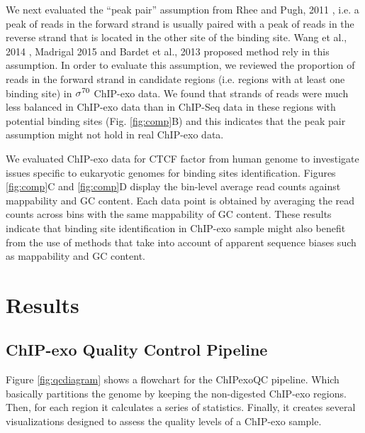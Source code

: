 \documentclass[11pt]{article}\usepackage[]{graphicx}\usepackage[]{color}
\begin{document}
We next evaluated the ``peak pair'' assumption from Rhee and Pugh,
2011 \cite{exo1}, i.e. a peak of reads in the forward strand is
usually paired with a peak of reads in the reverse strand that is
located in the other site of the binding site. Wang et al., 2014
\cite{mace}, Madrigal 2015 \cite{cexor} and Bardet et al., 2013
\cite{peakzilla} proposed method rely in this assumption. In order to
evaluate this assumption, we reviewed the proportion of reads in the
forward strand in candidate regions (i.e. regions with at least one
binding site) in $\sigma^{70}$ ChIP-exo data. We found that strands of reads
were much less balanced in ChIP-exo data than in ChIP-Seq data in
these regions with potential binding sites (Fig. \ref{fig:comp}B) and
this indicates that the peak pair assumption might not hold in real
ChIP-exo data.

We evaluated ChIP-exo data for CTCF factor from human genome
\cite{exo1} to investigate issues specific to eukaryotic genomes for
binding sites identification. Figures \ref{fig:comp}C and
\ref{fig:comp}D display the bin-level average read counts against
mappability and GC content. Each data point is obtained by averaging
the read counts across bins with the same mappability of GC
content. These results indicate that binding site identification in
ChIP-exo sample might also benefit from the use of methods that take
into account of apparent sequence biases such as mappability and GC
content.

\section{Results}
\label{sec:results}


\subsection{ChIP-exo Quality Control Pipeline}
\label{sec:QC}

Figure \ref{fig:qcdiagram} shows a flowchart for the ChIPexoQC
pipeline. Which basically partitions the genome by keeping the
non-digested ChIP-exo regions. Then, for each region it calculates a
series of statistics. Finally, it creates several visualizations
designed to assess the quality levels of a ChIP-exo sample.
\end{document}
